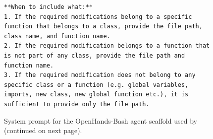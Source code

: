 \begin{figure}[!h]
\begin{tcolorbox}[colback=blue!6!white, colframe=blue!75!black, title=System Prompt for the OpenHands-Bash agent used by \methodname (continued on next page)]
\begin{lstlisting}
**When to include what:**
1. If the required modifications belong to a specific function that belongs to a class, provide the file path, class name, and function name.
2. If the required modification belongs to a function that is not part of any class, provide the file path and function name.
3. If the required modification does not belong to any specific class or a function (e.g. global variables, imports, new class, new global function etc.), it is sufficient to provide only the file path.
\end{lstlisting}
\end{tcolorbox}
\caption{System prompt for the OpenHands-Bash agent scaffold used by \methodname (continued on next page).}
\label{fig:system_prompt1}
\end{figure}

